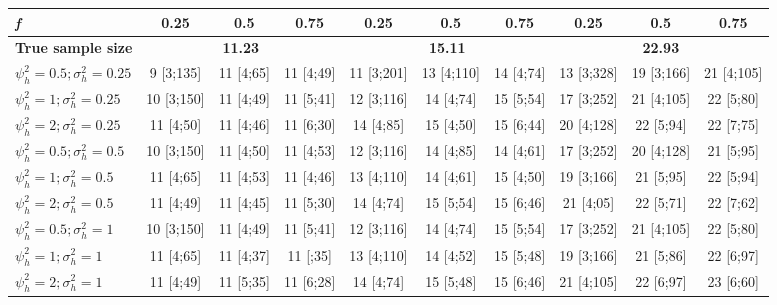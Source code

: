 \begin{table}[ht]
{\begin{tabular}{l c c c c c c c c c}
\addlinespace[1pt]
\cmidrule(lr){2-4} \cmidrule(lr){5-7} \cmidrule(lr){8-10}
\textbf{\textit{f}} & \textbf{0.25} & \textbf{0.5} & \textbf{0.75} & \textbf{0.25} & \textbf{0.5} & \textbf{0.75} & \textbf{0.25} & \textbf{0.5} & \textbf{0.75} \\
\hline
\textbf{True sample size} & \multicolumn{3}{c}{\textbf{11.23}} & \multicolumn{3}{c}{\textbf{15.11}} & \multicolumn{3}{c}{\textbf{22.93}} \\
$\psi_h^2 = 0.5; \sigma_h^2 = 0.25$ & 9 [3;135] & 11 [4;65] & 11 [4;49] & 11 [3;201] & 13 [4;110] & 14 [4;74] & 13 [3;328] & 19 [3;166] & 21 [4;105] \\
$\psi_h^2 = 1; \sigma_h^2 = 0.25$ & 10 [3;150] & 11 [4;49] & 11 [5;41] & 12 [3;116] & 14 [4;74] & 15 [5;54] & 17 [3;252] & 21 [4;105] & 22 [5;80] \\
$\psi_h^2 = 2; \sigma_h^2 = 0.25$ & 11 [4;50] & 11 [4;46] & 11 [6;30] & 14 [4;85] & 15 [4;50] & 15 [6;44] & 20 [4;128] & 22 [5;94] & 22 [7;75] \\
$\psi_h^2 = 0.5; \sigma_h^2 = 0.5$ & 10 [3;150] & 11 [4;50] & 11 [4;53] & 12 [3;116] & 14 [4;85] & 14 [4;61] & 17 [3;252] & 20 [4;128] & 21 [5;95] \\
$\psi_h^2 = 1; \sigma_h^2 = 0.5$ & 11 [4;65] & 11 [4;53] & 11 [4;46] & 13 [4;110] & 14 [4;61] & 15 [4;50] & 19 [3;166] & 21 [5;95] & 22 [5;94] \\
$\psi_h^2 = 2; \sigma_h^2 = 0.5$ & 11 [4;49] & 11 [4;45] & 11 [5;30] & 14 [4;74] & 15 [5;54] & 15 [6;46] & 21 [4;05] & 22 [5;71] & 22 [7;62] \\
$\psi_h^2 = 0.5; \sigma_h^2 = 1$ & 10 [3;150] & 11 [4;49] & 11 [5;41] & 12 [3;116] & 14 [4;74] & 15 [5;54] & 17 [3;252] & 21 [4;105] & 22 [5;80] \\
$\psi_h^2 = 1; \sigma_h^2 = 1$ & 11 [4;65] & 11 [4;37] & 11 [;35] & 13 [4;110] & 14 [4;52] & 15 [5;48] & 19 [3;166] & 21 [5;86] & 22 [6;97] \\
$\psi_h^2 = 2; \sigma_h^2 = 1$ & 11 [4;49] & 11 [5;35] & 11 [6;28] & 14 [4;74] & 15 [5;48] & 15 [6;46] & 21 [4;105] & 22 [6;97] & 23 [6;60] \\
\bottomrule
\end{tabular}}
\end{table}


